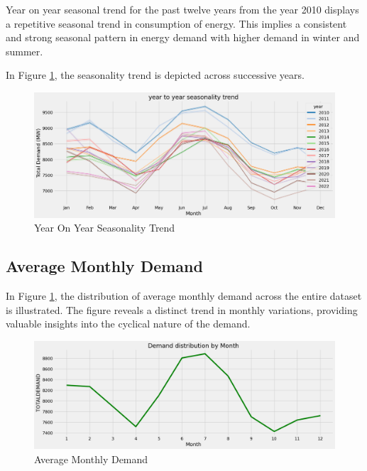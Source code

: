\documentclass[mstat,12pt]{unswthesis}
\begin{document}
Year on year seasonal trend for the past twelve years from the year 2010
displays a repetitive seasonal trend in consumption of energy. This
implies a consistent and strong seasonal pattern in energy demand with
higher demand in winter and summer.

In Figure \ref{fig:year_to_year_seasonality_trend}, the seasonality
trend is depicted across successive years.

\begin{figure}[H]
\includegraphics[width=1\linewidth,]{images/year_to_year_seasonality_trend} \caption{Year On Year Seasonality Trend}\label{fig:year_to_year_seasonality_trend}
\end{figure}

\hypertarget{average-monthly-demand}{%
\subsection{Average Monthly Demand}\label{average-monthly-demand}}

In Figure \ref{fig:year_to_year_seasonality_trend}, the distribution of
average monthly demand across the entire dataset is illustrated. The
figure reveals a distinct trend in monthly variations, providing
valuable insights into the cyclical nature of the demand.

\begin{figure}[H]
\includegraphics[width=1\linewidth,]{images/average_monthly_demand} \caption{Average Monthly Demand}\label{fig:average-monthly-demand}
\end{figure}
\end{document}
